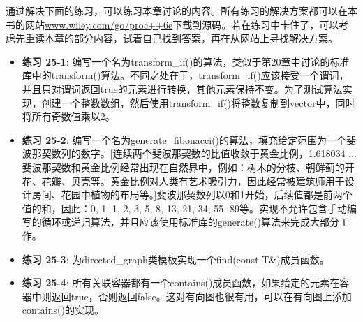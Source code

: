 通过解决下面的练习，可以练习本章讨论的内容。所有练习的解决方案都可以在本书的网站\url{www.wiley.com/go/proc++6e}下载到源码。若在练习中卡住了，可以考虑先重读本章的部分内容，试着自己找到答案，再在从网站上寻找解决方案。

\begin{itemize}
\item
\textbf{练习 25-1}: 编写一个名为transform\_if()的算法，类似于第20章中讨论的标准库中的transform()算法。不同之处在于，transform\_if()应该接受一个谓词，并且只对谓词返回true的元素进行转换，其他元素保持不变。为了测试算法实现，创建一个整数数组，然后使用transform\_if()将整数复制到vector中，同时将所有奇数值乘以2。

\item
\textbf{练习 25-2}: 编写一个名为generate\_fibonacci()的算法，填充给定范围为一个斐波那契数列的数字。[连续两个斐波那契数的比值收敛于黄金比例，1.618034 ... 斐波那契数和黄金比例经常出现在自然界中，例如：树木的分枝、朝鲜蓟的开花、花瓣、贝壳等。黄金比例对人类有艺术吸引力，因此经常被建筑师用于设计房间、花园中植物的布局等。]斐波那契数列以0和1开始，后续值都是前两个值的和，因此：0, 1, 1, 2, 3, 5, 8, 13, 21, 34, 55, 89等。实现不允许包含手动编写的循环或递归算法，并且应该使用标准库的generate()算法来完成大部分工作。

\item
\textbf{练习 25-3}: 为directed\_graph类模板实现一个find(const T\&)成员函数。

\item
\textbf{练习 25-4}: 所有关联容器都有一个contains()成员函数，如果给定的元素在容器中则返回true，否则返回false。这对有向图也很有用，可以在有向图上添加contains()的实现。
\end{itemize}











